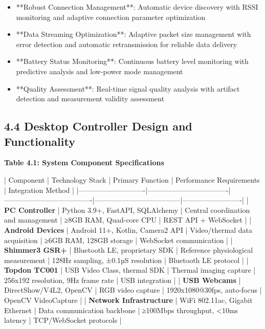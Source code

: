 \documentclass[12pt,a4paper]{article}
\begin{document}
\begin{itemize}
\item **Robust Connection Management**: Automatic device discovery with RSSI monitoring and adaptive connection parameter
  optimization
\item **Data Streaming Optimization**: Adaptive packet size management with error detection and automatic retransmission for
  reliable data delivery
\item **Battery Status Monitoring**: Continuous battery level monitoring with predictive analysis and low-power mode
  management
\item **Quality Assessment**: Real-time signal quality analysis with artifact detection and measurement validity assessment

\end{itemize}
\subsection{4.4 Desktop Controller Design and Functionality}

\textbf{Table 4.1: System Component Specifications}

| Component                  | Technology Stack                 | Primary Function                    | Performance Requirements           | Integration Method      |
|----------------------------|----------------------------------|-------------------------------------|------------------------------------|-------------------------|
| \textbf{PC Controller}          | Python 3.9+, FastAPI, SQLAlchemy | Central coordination and management | ≥8GB RAM, Quad-core CPU            | REST API + WebSocket    |
| \textbf{Android Devices}        | Android 11+, Kotlin, Camera2 API | Video/thermal data acquisition      | ≥6GB RAM, 128GB storage            | WebSocket communication |
| \textbf{Shimmer3 GSR+}          | Bluetooth LE, proprietary SDK    | Reference physiological measurement | 128Hz sampling, ±0.1µS resolution  | Bluetooth LE protocol   |
| \textbf{Topdon TC001}           | USB Video Class, thermal SDK     | Thermal imaging capture             | 256x192 resolution, 9Hz frame rate | USB integration         |
| \textbf{USB Webcams}            | DirectShow/V4L2, OpenCV          | RGB video capture                   | 1920x1080@30fps, auto-focus        | OpenCV VideoCapture     |
| \textbf{Network Infrastructure} | WiFi 802.11ac, Gigabit Ethernet  | Data communication backbone         | ≥100Mbps throughput, <10ms latency | TCP/WebSocket protocols |
\end{document}
